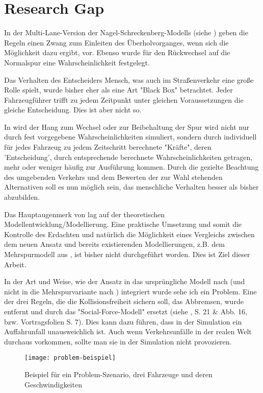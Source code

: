 \section{Research Gap}
\label{sec:researchgap}

In der Multi-Lane-Version der Nagel-Schreckenberg-Modells (siehe \cite{multi-lane}) geben die Regeln einen Zwang zum Einleiten des Überholvorganges, wenn sich die Möglichkeit dazu ergibt, vor. Ebenso wurde für den Rückwechsel auf die Normalspur eine Wahrscheinlichkeit festgelegt.

Das Verhalten des Entscheiders Mensch, was auch im Straßenverkehr eine große Rolle spielt, wurde bisher eher als eine Art "Black Box" betrachtet. 
Jeder Fahrzeugführer trifft zu jedem Zeitpunkt unter gleichen Voraussetzungen die gleiche Entscheidung. 
Dies ist aber nicht so.

In \cite{dat-ba} wird der Hang zum Wechsel oder zur Beibehaltung der Spur wird nicht nur durch fest vorgegebene Wahrscheinlichkeiten simuliert, sondern durch individuell für jedes Fahrzeug zu jedem Zeitschritt berechnete "Kräfte", deren 'Entscheidung', durch entsprechende berechnete Wahrscheinlichkeiten getragen, mehr oder weniger häufig zur Ausführung kommen. 
Durch die gezielte Beachtung des umgebenden Verkehrs und dem Bewerten der zur Wahl stehenden Alternativen soll es nun möglich sein, das menschliche Verhalten besser als bisher abzubilden.

Das Hauptaugenmerk von \cite{dat-ba} lag auf der theoretischen Modellentwicklung/Modellierung. 
Eine praktische Umsetzung und somit die Kontrolle des Erdachten und natürlich die Möglichkeit eines Vergleichs zwischen dem neuen Ansatz und bereits existierenden Modellierungen, z.B. dem Mehrspurmodell aus \cite{multi-lane}, ist bisher nicht durchgeführt worden. 
Dies ist Ziel dieser Arbeit.

In der Art und Weise, wie der Ansatz in das ursprüngliche Modell nach \cite{na-sch} (und nicht in die Mehrspurvariante nach \cite{multi-lane}) integriert wurde sehe ich ein Problem.
Eine der drei Regeln, die die Kollisionsfreiheit sichern soll, das Abbremsen, wurde entfernt und durch das "Social-Force-Modell" ersetzt (siehe \cite{dat-ba}, S. 21 \& Abb. 16, bzw. Vortragsfolien S. 7).
Dies kann dazu führen, dass in der Simulation ein Auffahrunfall unausweichlich ist.
Auch wenn Verkehrsunfälle in der realen Welt durchaus vorkommen, sollte man sie in der Simulation nicht provozieren.

\begin{figure}[hptb]
 \centering
 \texttt{[image: problem-beispiel]}
 \caption[Problem-Beispiel]{Beispiel für ein Problem-Szenario, drei Fahrzeuge und deren Geschwindigkeiten}
 \label{figure:problem-beispiel}
\end{figure}

